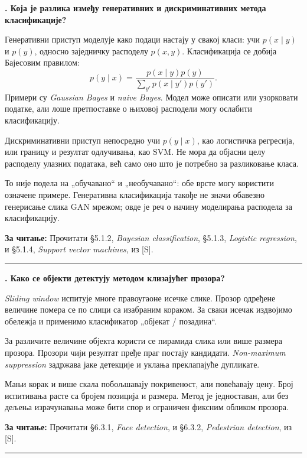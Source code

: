 \documentclass[10pt,a4paper]{article}
\newcommand{\en}[1]{\textit{#1}}
\newcounter{pitanje}
\newenvironment{odgovor}[1]{\stepcounter{pitanje}\begin{minipage}[t][0.455\textheight][t]{\textwidth}\vspace{0pt}\textbf{\thepitanje. #1}\par\smallskip}{\end{minipage}\par\ifodd\value{pitanje}\vspace{0.025\textheight}\hrule\vspace{0.015\textheight}\else\newpage\fi}
\newcommand{\izvor}[1]{\par\vfill{\footnotesize\textbf{За читање:} #1}\par}
\begin{document}
\begin{odgovor}{Која је разлика између генеративних и дискриминативних метода класификације?}
Генеративни приступ моделује како подаци настају у свакој класи: учи $p(x\mid y)$ и $p(y)$, односно заједничку расподелу $p(x,y)$. Класификација се добија Бајесовим правилом:
\[
p(y\mid x)=\frac{p(x\mid y)p(y)}{\sum_{y'}p(x\mid y')p(y')}.
\]
Примери су \en{Gaussian Bayes} и \en{naive Bayes}. Модел може описати или узорковати податке, али лоше претпоставке о њиховој расподели могу ослабити класификацију.

Дискриминативни приступ непосредно учи $p(y\mid x)$, као логистичка регресија, или границу и резултат одлучивања, као SVM. Не мора да објасни целу расподелу улазних података, већ само оно што је потребно за разликовање класа.

То није подела на „обучавано“ и „необучавано“: обе врсте могу користити означене примере. Генеративна класификација такође не значи обавезно генерисање слика GAN мрежом; овде је реч о начину моделирања расподела за класификацију.
\izvor{Прочитати §5.1.2, \en{Bayesian classification}, §5.1.3, \en{Logistic regression}, и §5.1.4, \en{Support vector machines}, из [S].}
\end{odgovor}

\begin{odgovor}{Како се објекти детектују методом клизајућег прозора?}
\en{Sliding window} испитује многе правоугаоне исечке слике. Прозор одређене величине помера се по слици са изабраним кораком. За сваки исечак издвојимо обележја и применимо класификатор „објекат / позадина“.
\begin{center}\end{center}
За различите величине објекта користи се пирамида слика или више размера прозора. Прозори чији резултат пређе праг постају кандидати. \en{Non-maximum suppression} задржава јаке детекције и уклања преклапајуће дупликате.

Мањи корак и више скала побољшавају покривеност, али повећавају цену. Број испитивања расте са бројем позиција и размера. Метод је једноставан, али без дељења израчунавања може бити спор и ограничен фиксним обликом прозора.
\izvor{Прочитати §6.3.1, \en{Face detection}, и §6.3.2, \en{Pedestrian detection}, из [S].}
\end{odgovor}
\end{document}
